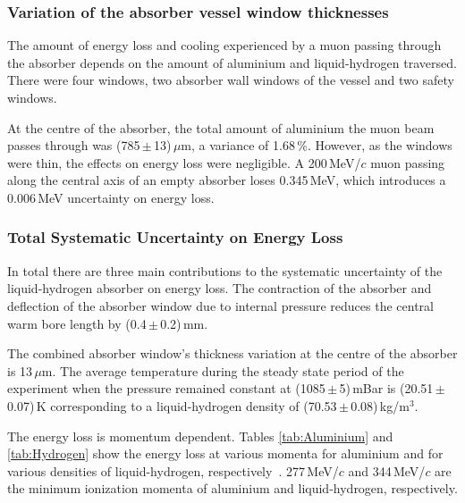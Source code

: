 \subsubsection{Variation of the absorber vessel window thicknesses}
\label{SubSect:Absorber_thickness}

The amount of energy loss and cooling experienced by a muon passing through the absorber depends on the amount of
aluminium and liquid-hydrogen traversed. There were four windows, two absorber wall windows of the vessel and two safety windows.

At the centre of the absorber, the total amount of aluminium the muon beam passes through was (785\,$\mathrm{\pm}$\,13)\,$\mu$m, a variance of 1.68\,\%. However, as the windows were thin, the effects on energy loss were negligible. A 200\,MeV/$c$ muon passing along the central axis of an empty absorber loses 0.345\,MeV, which introduces a 0.006\,MeV uncertainty on energy loss.


\subsubsection{Total Systematic Uncertainty on Energy Loss}
\label{SubSect:Absorber_total}

In total there are three main contributions to the systematic uncertainty of the liquid-hydrogen absorber on energy loss. The contraction of the absorber and deflection of the absorber window due to internal pressure reduces the central warm bore length by (0.4\,$\mathrm{\pm}$\,0.2)\,mm.

The combined absorber window's thickness variation at the centre of the absorber is 13\,$\mu$m. The average temperature during the steady state period of the experiment when the pressure remained constant at (1085\,$\mathrm{\pm}$\,5)\,mBar is (20.51\,$\mathrm{\pm}$\,0.07)\,K corresponding to a liquid-hydrogen density of (70.53\,$\mathrm{\pm}$\,0.08)\,kg/m$^{3}$.

The energy loss is momentum dependent. Tables \ref{tab:Aluminium} and \ref{tab:Hydrogen} show the energy loss at various momenta for aluminium and for various densities of liquid-hydrogen, respectively~\cite{AtomicAluminium}\cite{AtomicHydrogen}\cite{MuonAluminium}\cite{MuonliquidHydrogen}.
277\,MeV/$c$ and 344\,MeV/$c$ are the minimum ionization momenta of aluminium and liquid-hydrogen, respectively.



